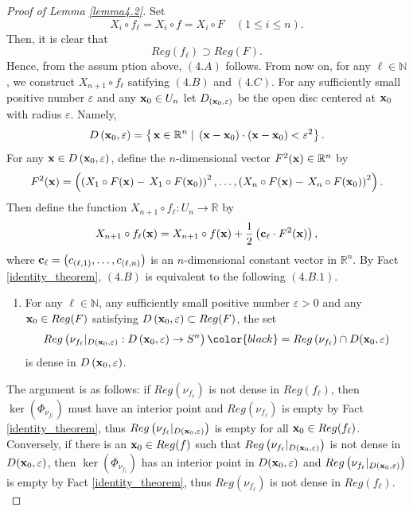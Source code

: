 \documentclass{amsart}
\theoremstyle{definition}
\theoremstyle{definition}
\theoremstyle{definition}
\newcommand{\ch}[1]{{\color{black} #1}}
\begin{document}
{{\begin{proof}[Proof of Lemma \ref{lemma4.2}]
{Set 
\[
X_i\circ f_\ell =X_i\circ f=X_i\circ F\quad (1\le i\le n).   
\]
Then, it is clear that 
\[
Reg\left(f_\ell\right)\supset Reg(F).    
\]
Hence, from the assum\ch{p}tion above, $(4.A)$ follows.   
From now on, for any 
$\ell\in \mathbb{N}$, 
we construct $X_{n+1}\circ f_\ell$ satifying  
$(4.B)$ and $(4.C)$.  
For any sufficiently small positive number $\varepsilon$ and 
any ${\bf x}_0\in U_n$ let $D_{\left({\bf x}_0, \varepsilon\right)}$ be the 
open disc centered at ${\bf x}_0$ with radius $\varepsilon$.   Namely, 
\[
D\left({\bf x}_0, \varepsilon\right)
=\left\{\left. {\bf x}\in \mathbb{R}^n\; \right|\; 
\left({\bf x}-{\bf x}_0\right)\cdot \left({\bf x}-{\bf x}_0\right)
< \varepsilon^2\right\}. 
\]        
For any  ${\bf x}\in D\left({\bf x}_0, \varepsilon\right)$, 
define the $n$-dimensional vector 
$F^2({\bf x})\in \mathbb{R}^n$ by 
\[
F^2({\bf x})=\left(\left(X_1\circ F({\bf x}\right) - 
\left.X_1\circ F({\bf x}_0)\right)^2, \ldots, 
\left(X_n\circ F({\bf x}\right) - 
\left.X_n\circ F({\bf x}_0)\right)^2\right).   
\]
Then define the function $X_{n+1}\circ f_\ell: U_n\to \mathbb{R}$ by 
\[
X_{n+1}\circ f_\ell({\bf x})= X_{n+1}\circ f({\bf x}) + 
\frac{1}{2}\left({\bf c}_\ell\cdot F^2({\bf x})\right), 
\]
where ${\bf c}_\ell =\left(c_{(\ell, 1)}, \ldots, c_{(\ell, n)}\right)$ is an 
$n$-dimensional constant vector in $\mathbb{R}^n$.
By Fact \ref{identity_theorem}, $(4.B)$ is equivalent to the following 
$(4.B.1)$.    
\smallskip 
\begin{enumerate}
\item[$(4.B.1)$] For any $\ell\in \mathbb{N}$, any sufficiently small 
positive number $\varepsilon>0$ and any ${\bf x}_0\in Reg(F)$ satisfying 
$D\left({\bf x}_0, \varepsilon\right)\subset Reg(F)$, 
the set 
\[
Reg\left(\nu_{f_\ell}|_{D\left({\bf x}_0, \varepsilon\right)}
: D\left({\bf x}_0, \varepsilon\right)\to S^n\right)\ch{=Reg\left(\nu_{f_\ell}\right) \cap D({\bf x}_0,\varepsilon)}
\] 
is %
dense in $D\left({\bf x}_0, \varepsilon\right)$.   
\end{enumerate}
\par  
\smallskip 
\ch{
	The argument is as follows: if $Reg(\nu_{f_\ell})$ is not %
	dense in $Reg(f_\ell)$, then $\ker(\Phi_{\nu_{f_\ell}})$ must have an interior point and $Reg(\nu_{f_\ell})$ is empty by Fact \ref{identity_theorem}, thus $Reg\left(\nu_{f_\ell}|_{D\left({\bf x}_0, \varepsilon\right)}\right)$ is empty for all ${\bf x}_0 \in Reg(f_\ell)$.
Conversely, if there is an ${\bf x}_0 \in Reg(f)$ such that $Reg\left(\nu_{f_\ell}|_{D\left({\bf x}_0,\varepsilon\right)}\right)$ is not %
dense in $D({\bf x}_0,\varepsilon)$, then $\ker(\Phi_{\nu_{f_\ell}})$ has an interior point in $D({\bf x}_0,\varepsilon)$ and $Reg\left(\nu_{f_\ell}|_{D\left({\bf x}_0, \varepsilon\right)}\right)$ is empty by Fact \ref{identity_theorem}, thus $Reg\left(\nu_{f_\ell}\right)$ is not %
dense in $Reg(f_\ell)$.
}

}
\end{proof}}}
\end{document}
